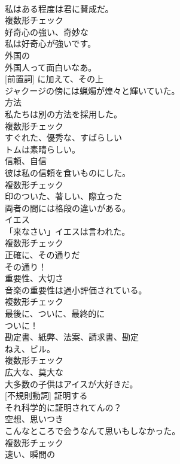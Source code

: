 \documentclass[8pt]{extreport}
\begin{document}
\begin{CJK}{UTF8}{min}
\\	私はある程度は君に賛成だ。	
\\	複数形チェック
\\	[形容詞]	好奇心の強い、奇妙な	
\\	私は好奇心が強いです。	
\\	[形容詞]	外国の	
\\	外国人って面白いなあ。	
\\	[副詞] [前置詞]	に加えて、その上	
\\	ジャクージの傍には蝋燭が煌々と輝いていた。	
\\	[名詞]	方法	
\\	私たちは別の方法を採用した。	
\\	複数形チェック
\\	[形容詞]	すぐれた、優秀な、すばらしい	
\\	トムは素晴らしい。	
\\	[名詞]	信頼、自信	
\\	彼は私の信頼を食いものにした。	
\\	複数形チェック
\\	[形容詞]	印のついた、著しい、際立った	
\\	両者の間には格段の違いがある。	
\\	[名詞]	イエス	
\\	「来なさい」イエスは言われた。	
\\	複数形チェック
\\	[副詞]	正確に、その通りだ	
\\	その通り！	
\\	[名詞]	重要性、大切さ	
\\	音楽の重要性は過小評価されている。	
\\	複数形チェック
\\	[副詞]	最後に、ついに、最終的に	
\\	ついに！	
\\	[名詞]	勘定書、紙弊、法案、請求書、勘定	
\\	ねえ、ビル。	
\\	複数形チェック
\\	[形容詞]	広大な、莫大な	
\\	大多数の子供はアイスが大好きだ。	
\\	[動詞] [不規則動詞]	証明する	
\\	それ科学的に証明されてんの？	
\\	[名詞]	空想、思いつき	
\\	こんなところで会うなんて思いもしなかった。	
\\	複数形チェック
\\	[形容詞]	速い、瞬間の	

\end{CJK}
\end{document}
